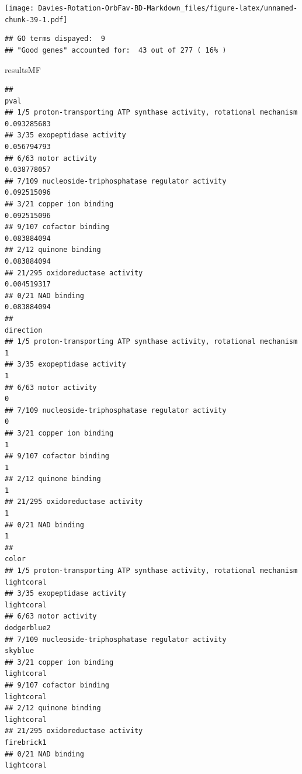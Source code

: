 \documentclass[
]{article}
\newenvironment{Shaded}{\begin{snugshade}}{\end{snugshade}}
\newcommand{\NormalTok}[1]{#1}
\begin{document}
\texttt{[image: Davies-Rotation-OrbFav-BD-Markdown\_files/figure-latex/unnamed-chunk-39-1.pdf]}

\begin{verbatim}
## GO terms dispayed:  9 
## "Good genes" accounted for:  43 out of 277 ( 16% )
\end{verbatim}

\begin{Shaded}
\begin{Highlighting}[]
\NormalTok{resultsMF}
\end{Highlighting}
\end{Shaded}

\begin{verbatim}
##                                                                            pval
## 1/5 proton-transporting ATP synthase activity, rotational mechanism 0.093285683
## 3/35 exopeptidase activity                                          0.056794793
## 6/63 motor activity                                                 0.038778057
## 7/109 nucleoside-triphosphatase regulator activity                  0.092515096
## 3/21 copper ion binding                                             0.092515096
## 9/107 cofactor binding                                              0.083884094
## 2/12 quinone binding                                                0.083884094
## 21/295 oxidoreductase activity                                      0.004519317
## 0/21 NAD binding                                                    0.083884094
##                                                                     direction
## 1/5 proton-transporting ATP synthase activity, rotational mechanism         1
## 3/35 exopeptidase activity                                                  1
## 6/63 motor activity                                                         0
## 7/109 nucleoside-triphosphatase regulator activity                          0
## 3/21 copper ion binding                                                     1
## 9/107 cofactor binding                                                      1
## 2/12 quinone binding                                                        1
## 21/295 oxidoreductase activity                                              1
## 0/21 NAD binding                                                            1
##                                                                           color
## 1/5 proton-transporting ATP synthase activity, rotational mechanism  lightcoral
## 3/35 exopeptidase activity                                           lightcoral
## 6/63 motor activity                                                 dodgerblue2
## 7/109 nucleoside-triphosphatase regulator activity                      skyblue
## 3/21 copper ion binding                                              lightcoral
## 9/107 cofactor binding                                               lightcoral
## 2/12 quinone binding                                                 lightcoral
## 21/295 oxidoreductase activity                                       firebrick1
## 0/21 NAD binding                                                     lightcoral
\end{verbatim}
\end{document}
